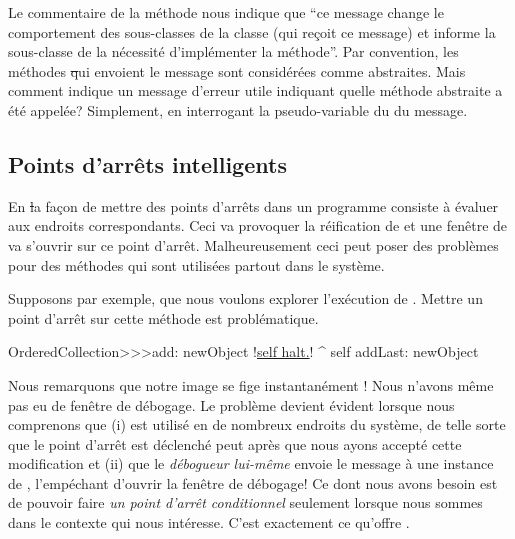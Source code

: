 \documentclass[a4paper,10pt,twoside]{book}
\begin{document}
Le commentaire de la méthode nous indique que ``ce message change le comportement des sous-classes de la classe (qui reçoit ce message) et informe la sous-classe de la nécessité d'implémenter la méthode''.%
Par convention, les méthodes \st qui envoient le message  sont considérées comme abstraites. Mais
comment \mbox{} indique un message d'erreur utile indiquant quelle méthode abstraite a été appelée? Simplement, en interrogant la pseudo-variable  du \sender du message.

\subsection{Points d'arrêts intelligents}

En \st la façon de mettre des points d'arrêts dans un programme consiste à évaluer  aux endroits correspondants. Ceci va provoquer la réification de  et une fenêtre de  va s'ouvrir sur ce point d'arrêt.
Malheureusement ceci peut poser des problèmes pour des méthodes qui sont utilisées partout dans le système.

Supposons par exemple, que nous voulons explorer l'exécution de .
Mettre un point d'arrêt sur cette méthode est problématique.

\begin{code}{}
OrderedCollection>>>add: newObject
	!\underline{self halt.}!
	^ self addLast: newObject
\end{code}

Nous remarquons que notre image se fige instantanément ! Nous n'avons même pas eu de fenêtre de débogage.
Le problème devient évident lorsque nous comprenons que (i)  est utilisé en de nombreux endroits du système, de telle sorte que le point d'arrêt est déclenché peut après que nous ayons accepté cette modification et (ii) que le \emph{débogueur lui-même} envoie le message  à une instance de , l'empéchant d'ouvrir la fenêtre de débogage!
Ce dont nous avons besoin est de pouvoir faire \emph{un point d'arrêt conditionnel} seulement lorsque nous sommes dans le contexte qui nous intéresse.
C'est exactement ce qu'offre .
\end{document}
